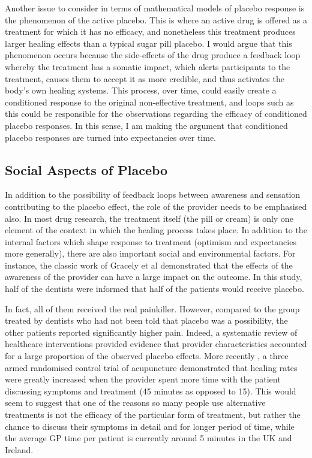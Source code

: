 Another issue to consider in terms of mathematical models of placebo response is the phenomenon of the active placebo. This is where an active drug is offered as a treatment for which it has no efficacy, and nonetheless this treatment produces larger healing effects than a typical sugar pill placebo. I would argue that this phenomenon occurs because the side-effects of the drug produce  a feedback loop whereby the treatment has a somatic impact, which alerts participants to the treatment, causes them to accept it as more credible, and thus activates the body's own healing systems. This process, over time, could easily create a conditioned response to the original non-effective treatment, and loops such as this could be responsible for the observations regarding the efficacy of conditioned placebo responses. In this sense, I am making the argument that conditioned placebo responses are turned into expectancies over time.   


\subsection{Social Aspects of Placebo}

In addition to the possibility of feedback loops between awareness and sensation contributing to the placebo effect, the role of the provider needs to be emphasised also. In most drug research, the treatment itself (the pill or cream) is only one element of the context in which the healing process takes place. In addition to the internal factors which shape response to treatment (optimism and expectancies more generally), there are also important social and environmental factors. For instance, the classic work of Gracely et al \cite{Gracely1985} demonstrated that the effects of the awareness of the provider can have a large impact on the outcome. In this study, half of the dentists were informed that half of the patients would receive placebo. 

In fact, all of them received the real painkiller. However, compared to the group treated by dentists who had not been told that placebo was a possibility, the other patients reported significantly higher pain. Indeed, a systematic review of healthcare interventions \cite{diblasi2001} provided evidence that provider characteristics accounted for a large proportion of the observed placebo effects. More recently \cite{Kaptchuk2008}, a three armed randomised control trial of acupuncture demonstrated that healing rates were greatly increased when the provider spent more time with the patient discussing symptoms and treatment (45 minutes as opposed to 15). This would seem to suggest that one of the reasons so many people use alternative treatments is not the efficacy of the particular form of treatment, but rather the chance to discuss their symptoms in detail and for longer period of time, while the average GP time per patient is currently around 5 minutes in the UK and Ireland. 


